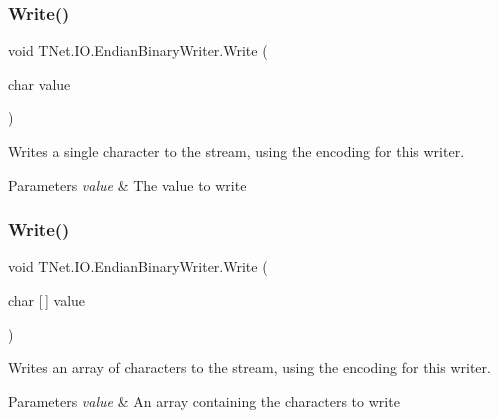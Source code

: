 \subsubsection{\texorpdfstring{Write()}{Write()}\hspace{0.1cm}{\footnotesize\ttfamily [15/17]}}
{\footnotesize\ttfamily void T\+Net.\+I\+O.\+Endian\+Binary\+Writer.\+Write (\begin{DoxyParamCaption}\item[{char}]{value }\end{DoxyParamCaption})}



Writes a single character to the stream, using the encoding for this writer. 


\begin{DoxyParams}{Parameters}
{\em value} & The value to write\\
\hline
\end{DoxyParams}
\mbox{\label{class_t_net_1_1_i_o_1_1_endian_binary_writer_add56922a40bf9ad7755738d80bd57cd2}} 
\subsubsection{\texorpdfstring{Write()}{Write()}\hspace{0.1cm}{\footnotesize\ttfamily [16/17]}}
{\footnotesize\ttfamily void T\+Net.\+I\+O.\+Endian\+Binary\+Writer.\+Write (\begin{DoxyParamCaption}\item[{char \mbox{[}$\,$\mbox{]}}]{value }\end{DoxyParamCaption})}



Writes an array of characters to the stream, using the encoding for this writer. 


\begin{DoxyParams}{Parameters}
{\em value} & An array containing the characters to write\\
\hline
\end{DoxyParams}
\mbox{\label{class_t_net_1_1_i_o_1_1_endian_binary_writer_a457b0c305afc6ba5d1fccec7c5904ef3}} 
